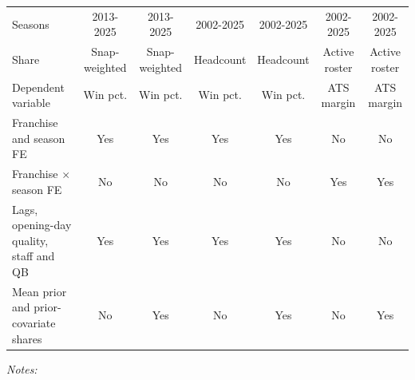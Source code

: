 \begin{table}[!h]
{\begin{threeparttable}
\begin{tabular}[t]{lcccccc}
Seasons & 2013-2025 & 2013-2025 & 2002-2025 & 2002-2025 & 2002-2025 & 2002-2025\\
Share & Snap-weighted & Snap-weighted & Headcount & Headcount & Active roster & Active roster\\
Dependent variable & Win pct. & Win pct. & Win pct. & Win pct. & ATS margin & ATS margin\\
Franchise and season FE & Yes & Yes & Yes & Yes & No & No\\
Franchise $\times$ season FE & No & No & No & No & Yes & Yes\\
Lags, opening-day quality, staff and QB & Yes & Yes & Yes & Yes & No & No\\
Mean prior and prior-covariate shares & No & Yes & No & Yes & No & Yes\\
\bottomrule
\end{tabular}
\begin{tablenotes}[para]
\item \textit{Notes:} 

\end{tablenotes}
\end{threeparttable}}
\end{table}
